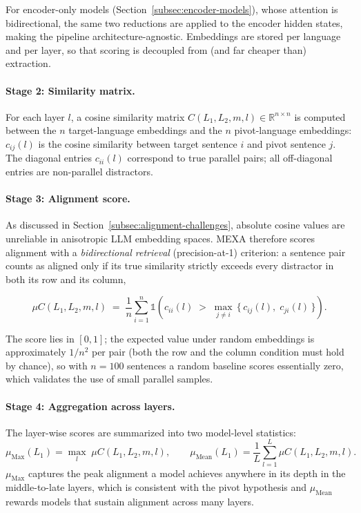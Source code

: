 For encoder-only models (Section~\ref{subsec:encoder-models}), whose
attention is bidirectional, the same two reductions are applied to the
encoder hidden states, making the pipeline architecture-agnostic.
Embeddings are stored per language and per layer, so that scoring is
decoupled from (and far cheaper than) extraction.

\paragraph{Stage 2: Similarity matrix.}
For each layer $l$, a cosine similarity matrix
$C(L_1, L_2, m, l) \in \mathbb{R}^{n \times n}$ is computed between the
$n$ target-language embeddings and the $n$ pivot-language embeddings:
$c_{ij}(l)$ is the cosine similarity between target sentence $i$ and pivot
sentence $j$. The diagonal entries $c_{ii}(l)$ correspond to true parallel
pairs; all off-diagonal entries are non-parallel distractors.

\paragraph{Stage 3: Alignment score.}
As discussed in Section~\ref{subsec:alignment-challenges}, absolute cosine
values are unreliable in anisotropic LLM embedding spaces. MEXA therefore
scores alignment with a \emph{bidirectional retrieval} (precision-at-1)
criterion: a sentence pair counts as aligned only if its true similarity
strictly exceeds every distractor in both its row and its column,

\begin{equation}
    \mu C(L_1, L_2, m, l)
    \;=\;
    \frac{1}{n}
    \sum_{i=1}^{n}
    \mathbb{1}\!\left(
        c_{ii}(l) \;>\; \max_{j \neq i}\,\{\, c_{ij}(l),\; c_{ji}(l) \,\}
    \right).
    \label{eq:mexa}
\end{equation}

The score lies in $[0, 1]$; the expected value under random embeddings is
approximately $1/n^2$ per pair (both the row and the column condition must
hold by chance), so with $n = 100$ sentences a random baseline scores
essentially zero, which validates the use of small parallel samples.

\paragraph{Stage 4: Aggregation across layers.}
The layer-wise scores are summarized into two model-level statistics:
\begin{equation}
    \mu_{\text{Max}}(L_1) = \max_{l} \; \mu C(L_1, L_2, m, l),
    \qquad
    \mu_{\text{Mean}}(L_1) = \frac{1}{L} \sum_{l=1}^{L} \mu C(L_1, L_2, m, l).
\end{equation}
$\mu_{\text{Max}}$ captures the peak alignment a model achieves anywhere
in its depth in the middle-to-late layers, which is consistent with
the pivot hypothesis and $\mu_{\text{Mean}}$ rewards models that
sustain alignment across many layers. 

